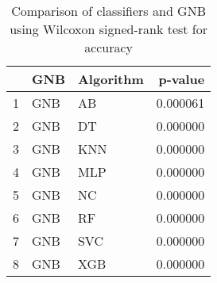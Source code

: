 \begin{table}
\footnotesize
\caption{Comparison of classifiers and GNB using Wilcoxon signed-rank test for accuracy}
\label{tab:GNB wilcoxon ACC comparison}
\begin{tabular}{lllr}
\hline
 & GNB & Algorithm & p-value \\
\hline
1 & GNB & AB & 0.000061 \\
2 & GNB & DT & 0.000000 \\
3 & GNB & KNN & 0.000000 \\
4 & GNB & MLP & 0.000000 \\
5 & GNB & NC & 0.000000 \\
6 & GNB & RF & 0.000000 \\
7 & GNB & SVC & 0.000000 \\
8 & GNB & XGB & 0.000000 \\
\hline
\end{tabular}
\end{table}
